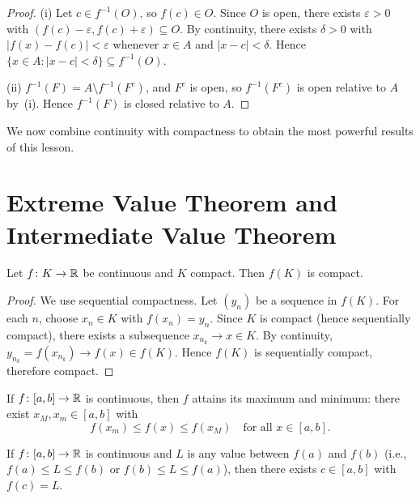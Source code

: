 \documentclass[11pt,a4paper]{article}
\begin{document}
\begin{proof}
(i) Let $c \in f^{-1}(O)$, so $f(c) \in O$. Since $O$ is open, there
exists $\varepsilon > 0$ with $(f(c) - \varepsilon,
f(c) + \varepsilon) \subseteq O$. By continuity, there exists $\delta > 0$
with $|f(x) - f(c)| < \varepsilon$ whenever $x \in A$ and
$|x - c| < \delta$. Hence $\{x \in A : |x - c| < \delta\} \subseteq
f^{-1}(O)$.

(ii) $f^{-1}(F) = A \setminus f^{-1}(F^c)$, and $F^c$ is open, so
$f^{-1}(F^c)$ is open relative to $A$ by~(i). Hence $f^{-1}(F)$ is closed
relative to $A$.
\end{proof}

We now combine continuity with compactness to obtain the most powerful
results of this lesson.

\section{Extreme Value Theorem and Intermediate Value Theorem}
\label{sec:evt_ivt}

\begin{theorem}
\label{thm:cont_compact}
Let $f \colon K \to \mathbb{R}$ be continuous and $K$ compact. Then $f(K)$ is
compact.
\end{theorem}

\begin{proof}
We use sequential compactness. Let $(y_n)$ be a sequence in $f(K)$.
For each $n$, choose $x_n \in K$ with $f(x_n) = y_n$. Since $K$ is
compact (hence sequentially compact), there exists a subsequence
$x_{n_k} \to x \in K$. By continuity, $y_{n_k} = f(x_{n_k}) \to f(x)
\in f(K)$. Hence $f(K)$ is sequentially compact, therefore compact.
\end{proof}

\begin{keyresult}[title={Extreme Value Theorem and Intermediate Value Theorem}]
\begin{theorem}
\label{thm:evt}
If $f \colon [a, b] \to \mathbb{R}$ is continuous, then $f$ attains its maximum
and minimum: there exist $x_M, x_m \in [a, b]$ with
\[
  f(x_m) \le f(x) \le f(x_M) \quad \text{for all } x \in [a, b].
\]
\end{theorem}

\begin{theorem}
\label{thm:ivt}
If $f \colon [a, b] \to \mathbb{R}$ is continuous and $L$ is any value between
$f(a)$ and $f(b)$ (i.e., $f(a) \le L \le f(b)$ or
$f(b) \le L \le f(a)$), then there exists $c \in [a, b]$ with $f(c) = L$.
\end{theorem}
\end{keyresult}
\end{document}

